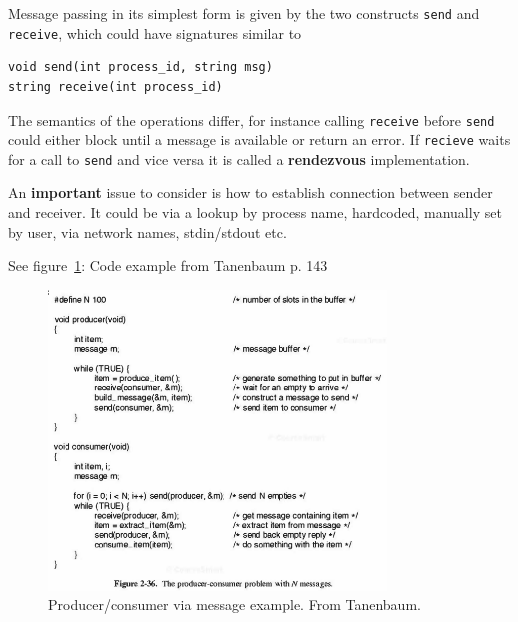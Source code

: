 
Message passing in its simplest form is given by the two constructs \texttt{send} and \texttt{receive}, which could have signatures similar to

\begin{lstlisting}
void send(int process_id, string msg)
string receive(int process_id)
\end{lstlisting}

The semantics of the operations differ, for instance calling \texttt{receive} before \texttt{send} could either block until a message is available or return an error. If \texttt{recieve} waits for a call to \texttt{send} and vice versa it is called a \textbf{rendezvous} implementation.

An \textbf{important} issue to consider is how to establish connection between sender and receiver. It could be via a lookup by process name, hardcoded, manually set by user, via network names, stdin/stdout etc.

See figure~\ref{fig:msg-passing}: Code example from Tanenbaum p. 143
\begin{figure}[h]
  \centering
  \includegraphics[width=0.8\textwidth]{images/message_passing}
  \caption{Producer/consumer via message example. From Tanenbaum.}
  \label{fig:msg-passing}
\end{figure}

